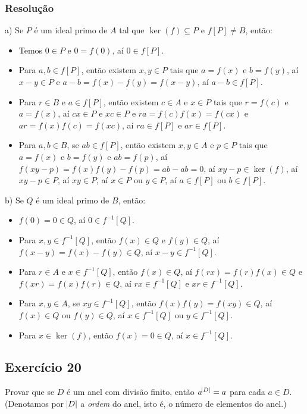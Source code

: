 \documentclass[10pt,a4paper]{article}
\begin{document}
\subsubsection*{Resolução}

a) Se $P$ é um ideal primo de $A$ tal que $\ker(f)\subseteq P$ e $f[P]\neq B$, então:
\begin{itemize}
\item Temos $0\in P$ e $0=f(0)$, aí $0\in f[P]$.
\item Para $a,b\in f[P]$, então existem $x,y\in P$ tais que $a=f(x)$ e $b=f(y)$, aí $x-y\in P$ e $a-b=f(x)-f(y)=f(x-y)$, aí $a-b\in f[P]$.
\item Para $r\in B$ e $a\in f[P]$, então existem $c\in A$ e $x\in P$ tais que $r=f(c)$ e $a=f(x)$, aí $cx\in P$ e $xc\in P$ e $ra=f(c)f(x)=f(cx)$ e $ar=f(x)f(c)=f(xc)$, aí $ra\in f[P]$ e $ar\in f[P]$.
\item Para $a,b\in B$, se $ab\in f[P]$, então existem $x,y\in A$ e $p\in P$ tais que $a=f(x)$ e $b=f(y)$ e $ab=f(p)$, aí $f(xy-p)=f(x)f(y)-f(p)=ab-ab=0$, aí $xy-p\in\ker(f)$, aí $xy-p\in P$, aí $xy\in P$, aí $x\in P$ ou $y\in P$, aí $a\in f[P]$ ou $b\in f[P]$.
\end{itemize}

\noindent
b) Se $Q$ é um ideal primo de $B$, então:
\begin{itemize}
\item $f(0)=0\in Q$, aí $0\in f^{-1}[Q]$.
\item Para $x,y\in f^{-1}[Q]$, então $f(x)\in Q$ e $f(y)\in Q$, aí $f(x-y)=f(x)-f(y)\in Q$, aí $x-y\in f^{-1}[Q]$.
\item Para $r\in A$ e $x\in f^{-1}[Q]$, então $f(x)\in Q$, aí $f(rx)=f(r)f(x)\in Q$ e $f(xr)=f(x)f(r)\in Q$, aí $rx\in f^{-1}[Q]$ e $xr\in f^{-1}[Q]$.
\item Para $x,y\in A$, se $xy\in f^{-1}[Q]$, então $f(x)f(y)=f(xy)\in Q$, aí $f(x)\in Q$ ou $f(y)\in Q$, aí $x\in f^{-1}[Q]$ ou $y\in f^{-1}[Q]$.
\item Para $x\in\ker(f)$, então $f(x)=0\in Q$, aí $x\in f^{-1}[Q]$.
\end{itemize}

\newpage

\subsection*{Exercício 20}
Provar que se $D$ é um anel com divisão finito, então $a^{\abs{D}}=a$ para cada $a\in D$. (Denotamos por $\abs{D}$ a \textit{ordem} do anel, isto é, o número de elementos do anel.)
\end{document}
